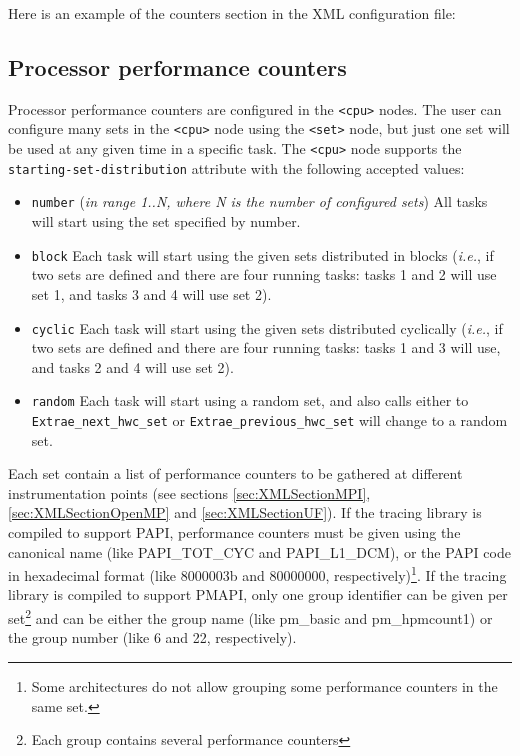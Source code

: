 Here is an example of the counters section in the XML configuration file:




\subsection{Processor performance counters}\label{subsec:ProcessorPerformanceCounters}

Processor performance counters are configured in the {\tt <cpu>} nodes. The user can configure many sets in the {\tt <cpu>} node using the {\tt <set>} node, but just one set will be used at any given time in a specific task. The {\tt <cpu>} node supports the {\tt starting-set-distribution} attribute with the following accepted values:

\begin{itemize}
 \item {\tt number} ({\em in range 1..N, where N is the number of configured sets}) All tasks will start using the set specified by number.
 \item {\tt block} Each task will start using the given sets distributed in blocks ({\em i.e.}, if two sets are defined and there are four running tasks: tasks 1 and 2 will use set 1, and tasks 3 and 4 will use set 2).
 \item {\tt cyclic} Each task will start using the given sets distributed cyclically ({\em i.e.}, if two sets are defined and there are four running tasks: tasks 1 and 3 will use, and tasks 2 and 4 will use set 2).
 \item {\tt random} Each task will start using a random set, and also calls either to {\tt Extrae\_next\_hwc\_set} or {\tt Extrae\_previous\_hwc\_set} will change to a random set.
\end{itemize}

Each set contain a list of performance counters to be gathered at different instrumentation points (see sections \ref{sec:XMLSectionMPI}, \ref{sec:XMLSectionOpenMP} and \ref{sec:XMLSectionUF}). If the tracing library is compiled to support PAPI, performance counters must be given using the canonical name (like PAPI\_TOT\_CYC and PAPI\_L1\_DCM), or the PAPI code in hexadecimal format (like 8000003b and 80000000, respectively)\footnote{Some architectures do not allow grouping some performance counters in the same set.}. If the tracing library is compiled to support PMAPI, only one group identifier can be given per set\footnote{Each group contains several performance counters} and can be either the group name (like pm\_basic and pm\_hpmcount1) or the group number (like 6 and 22, respectively). 

